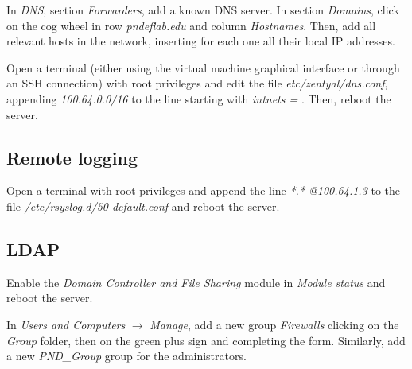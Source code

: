 \documentclass[draft]{homework}
\begin{document}
    In \textit{DNS}, section \textit{Forwarders}, add a known DNS server.
    In section \textit{Domains}, click on the cog wheel in row \textit{pndeflab.edu} and column \textit{Hostnames}.
    Then, add all relevant hosts in the network, inserting for each one all their local IP addresses.
    
    Open a terminal (either using the virtual machine graphical interface or through an SSH connection) with root privileges and edit the file \textit{etc/zentyal/dns.conf}, appending \textit{100.64.0.0/16} to the line starting with \textit{intnets = }. Then, reboot the server.
    
    \subsection{Remote logging}
    Open a terminal with root privileges and append the line \textit{*.* @100.64.1.3} to the file \textit{/etc/rsyslog.d/50-default.conf} and reboot the server.

    \subsection{LDAP}
    Enable the \textit{Domain Controller and File Sharing } module in \textit{Module status} and reboot the server.
    
    In \textit{Users and Computers} $\rightarrow$ \textit{Manage}, add a new group \textit{Firewalls} clicking on the \textit{Group} folder, then on the green plus sign and completing the form.
    Similarly, add a new \textit{PND\_Group} group for the administrators.
    
\end{document}

